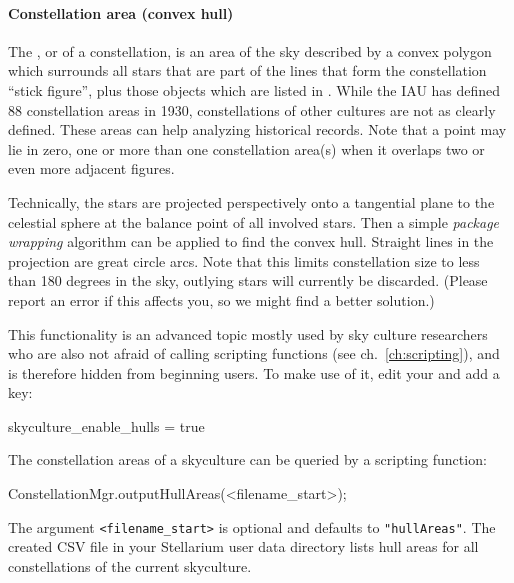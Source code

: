 \paragraph{Constellation area (convex hull)}
\label{SC:constellation_area}
The , or  of a constellation, 
is an area of the sky described by a convex polygon which surrounds all stars that are part of the lines that form the constellation ``stick figure'', 
plus those objects which are listed in . 
While the IAU has defined 88 constellation areas in 1930, constellations of other cultures are not as clearly defined. These areas can help analyzing historical records.
Note that a point may lie in zero, one or more than one constellation area(s) when it overlaps two or even more adjacent figures. 

Technically, the stars are projected perspectively onto a tangential plane to the celestial sphere 
at the balance point of all involved stars. 
Then a simple \emph{package wrapping} algorithm \citep[ch.25]{Sedgewick:AlgorithmsInC} can be applied to find the convex hull. 
Straight lines in the projection are great circle arcs. 
Note that this limits constellation size to less than 180 degrees in the sky, 
outlying stars will currently be discarded. 
(Please report an error if this affects you, so we might find a better solution.)

This functionality is an advanced topic mostly used by sky culture researchers \citep[e.g.][94-98]{Hoffmann2017a} who are also not afraid of calling scripting functions (see ch.~\ref{ch:scripting}), 
and is therefore hidden from beginning users. To make use of it, edit your  and add a key:
\begin{configfile}
[gui]
skyculture_enable_hulls = true 
\end{configfile}


The constellation areas of a skyculture can be queried by a scripting function:
\begin{script}
ConstellationMgr.outputHullAreas(<filename_start>);
\end{script}
The argument \texttt{<filename\_start>} is optional and defaults to \texttt{"hullAreas"}. 
The created CSV file  in your Stellarium user data directory lists hull areas for all constellations of the current skyculture. 


